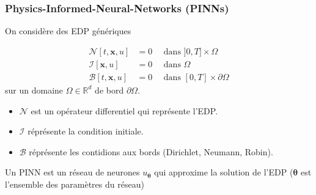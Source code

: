\documentclass[9pt]{beamer}
\newcommand{\bbm}[1]{{\mathbf{#1}}}
\begin{document}
\begin{frame}
    \frametitle{Physics-Informed-Neural-Networks (PINNs)}

    On considère des EDP génériques  

    \begin{align*}
        \mathcal{N}[t,\bbm x, u] &= 0 \quad \text{ dans } ]0,T]\times\Omega\\
        \mathcal{I}[\bbm x, u] &= 0 \quad \text{ dans } \Omega\\      
        \mathcal{B}[t,\bbm x, u] &= 0 \quad \text{ dans } [0,T]\times \partial\Omega
        \label{pde:1}
    \end{align*} 
    sur un domaine $\Omega\in\mathbb{R}^d$ de bord $\partial \Omega$.

    \begin{itemize}
        \item $\mathcal{N}$ est un opérateur differentiel qui représente l'EDP.
        \item $\mathcal{I}$ réprésente la condition initiale.
        \item $\mathcal{B}$  réprésente les contidions aux bords (Dirichlet, Neumann, Robin).
    \end{itemize}

    \begin{exampleblock}{\vspace*{-2ex}}
       
    Un PINN est un réseau de neurones $u_{\bm \theta}$ qui approxime la solution de l'EDP
    ($\bm \theta$ est l'ensemble des paramètres du réseau)
    \end{exampleblock}

\end{frame}
\end{document}
